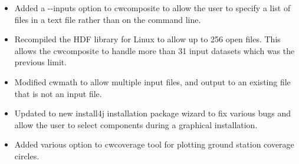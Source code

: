 \begin{itemize}
  \item Added a -{-}inputs option to cwcomposite to allow the user to
  specify a list of files in a text file rather than on the command
  line.

  \item Recompiled the HDF library for Linux to allow up to 256 open
  files. This allows the cwcomposite to handle more than 31 input
  datasets which was the previous limit.

  \item Modified cwmath to allow multiple input files, and output to
  an existing file that is not an input file.

  \item Updated to new install4j installation package wizard to fix
  various bugs and allow the user to select components during a
  graphical installation.

  \item Added various option to cwcoverage tool for plotting ground
  station coverage circles.

\end{itemize}

